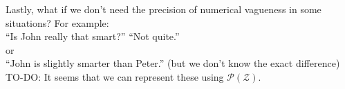 Lastly, what if we don't need the precision of numerical vagueness in some situations?  For example:\\
\hspace*{1cm} ``Is John really that smart?'' ``Not quite.''\\
or\\
\hspace*{1cm} ``John is slightly smarter than Peter.'' (but we don't know the exact difference)\\
TO-DO:  It seems that we can represent these using $\mathcal{P}(\mathcal{Z})$.



